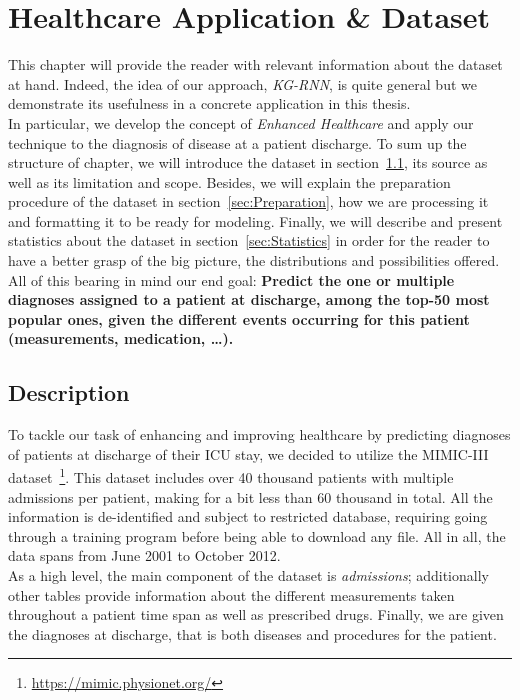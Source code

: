 \chapter{Healthcare Application \& Dataset}
\label{chap:Dataset}
This chapter will provide the reader with relevant information about the dataset at hand. Indeed, the idea of our approach, \emph{KG-RNN}, is quite general but we demonstrate its usefulness in a concrete application in this thesis. \\

In particular, we develop the concept of \emph{Enhanced Healthcare} and apply our technique to the diagnosis of disease at a patient discharge. To sum up the structure of chapter, we will introduce the dataset in section~\ref{sec:Description}, its source as well as its limitation and scope. Besides, we will explain the preparation procedure of the dataset in section~\ref{sec:Preparation}, how we are processing it and formatting it to be ready for modeling. Finally, we will describe and present statistics about the dataset in section~\ref{sec:Statistics} in order for the reader to have a better grasp of the big picture, the distributions and possibilities offered. \\

All of this bearing in mind our end goal: \textbf{Predict the one or multiple diagnoses assigned to a patient at discharge, among the top-50 most popular ones, given the different events occurring for this patient (measurements, medication, \dots).}

\section{Description}
\label{sec:Description}
To tackle our task of enhancing and improving healthcare by predicting diagnoses of patients at discharge of their ICU stay, we decided to utilize the MIMIC-III dataset~\footnote{\url{https://mimic.physionet.org/}}. This dataset includes over 40 thousand patients with multiple admissions per patient, making for a bit less than 60 thousand in total. All the information is de-identified and subject to restricted database, requiring going through a training program before being able to download any file. All in all, the data spans from June 2001 to October 2012. \\

As a high level, the main component of the dataset is \textit{admissions}; additionally other tables provide information about the different measurements taken throughout a patient time span as well as prescribed drugs. Finally, we are given the diagnoses at discharge, that is both diseases and procedures for the patient. \\

